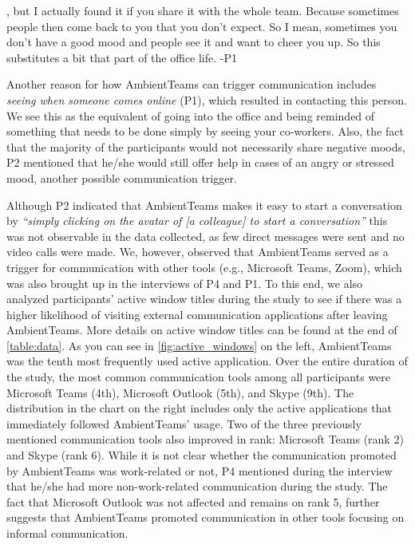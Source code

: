 \begin{displayquote}[][]
    [...], but I actually found it if you share it with the whole team. Because sometimes people then come back to you that you don't expect. So I mean, sometimes you don't have a good mood and people see it and want to cheer you up. So this substitutes a bit that part of the office life. -P1
\end{displayquote}

Another reason for how AmbientTeams can trigger communication includes \textit{seeing when someone comes online} (P1), which resulted in contacting this person. We see this as the equivalent of going into the office and being reminded of something that needs to be done simply by seeing your co-workers. Also, the fact that the majority of the participants would not necessarily share negative moods, P2 mentioned that he/she would still offer help in cases of an angry or stressed mood, another possible communication trigger.

Although P2 indicated that AmbientTeams makes it easy to start a conversation by \textit{\enquote{simply clicking on the avatar of [a colleague] to start a conversation}} this was not observable in the data collected, as few direct messages were sent and no video calls were made. We, however, observed that AmbientTeams served as a trigger for communication with other tools (e.g., Microsoft Teams, Zoom), which was also brought up in the interviews of P4 and P1. To this end, we also analyzed participants' active window titles during the study to see if there was a higher likelihood of visiting external communication applications after leaving AmbientTeams. More details on active window titles can be found at the end of \autoref{table:data}. As you can see in \autoref{fig:active_windows} on the left, AmbientTeams was the tenth most frequently used active application. Over the entire duration of the study, the most common communication tools among all participants were Microsoft Teams (4th), Microsoft Outlook (5th), and Skype (9th). The distribution in the chart on the right includes only the active applications that immediately followed AmbientTeams' usage. Two of the three previously mentioned communication tools also improved in rank: Microsoft Teams (rank 2) and Skype (rank 6). While it is not clear whether the communication promoted by AmbientTeams was work-related or not, P4 mentioned during the interview that he/she had more non-work-related communication during the study. The fact that Microsoft Outlook was not affected and remains on rank 5, further suggests that AmbientTeams promoted communication in other tools focusing on informal communication.

